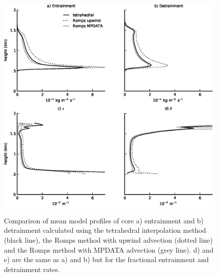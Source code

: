 \documentclass[12pt]{article}
\begin{document}
\begin{figure}[t]
  \noindent
  \includegraphics[width=40pc,angle=0]{./figures/direct_vs_romps}\\
  \caption{Comparison of mean model profiles of core a) entrainment and b) 
  detrainment calculated using the tetrahedral interpolation method (black 
  line), the Romps method with upwind advection (dotted line) and the Romps 
  method with MPDATA advection (grey line).  d) and e) are the same 
  as a) and b) but for the fractional entrainment and detrainment rates.}
  \label{fig:direct_vs_romps}
\end{figure}
\end{document}
